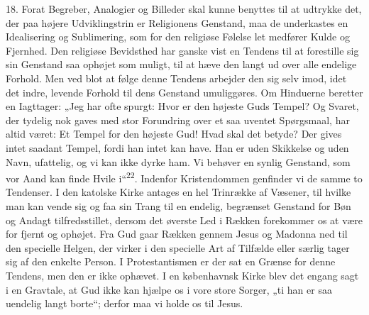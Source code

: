 \documentclass[12pt,a4paper,openany]{book}
\begin{document}
18. Forat Begreber, Analogier og Billeder skal kunne benyttes til at
udtrykke det, der paa højere Udviklingstrin er Religionens Genstand, maa
de underkastes en Idealisering og Sublimering, som for den religiøse
Følelse let medfører Kulde og Fjernhed. Den religiøse Bevidsthed har
ganske vist en Tendens til at forestille sig sin Genstand saa ophøjet
som muligt, til at hæve den langt ud over alle endelige Forhold. Men ved
blot at følge denne Tendens arbejder den sig selv imod, idet det indre,
levende Forhold til dens Genstand umuliggøres. Om Hinduerne beretter en
Iagttager: „Jeg har ofte spurgt: Hvor er den højeste Guds Tempel? Og
Svaret, der tydelig nok gaves med stor Forundring over et saa uventet
Spørgsmaal, har altid været: Et Tempel for den højeste Gud! Hvad skal
det betyde? Der gives intet saadant Tempel, fordi han intet kan have.
Han er uden Skikkelse og uden Navn, ufattelig, og vi kan ikke dyrke ham.
Vi behøver en synlig Genstand, som vor Aand kan finde Hvile
i“\textsuperscript{22}. Indenfor Kristendommen genfinder vi de samme to
Tendenser. I den katolske Kirke antages en hel Trinrække af Væsener, til
hvilke man kan vende sig og faa sin Trang til en endelig, begrænset
Genstand for Bøn og Andagt tilfredsstillet, dersom det øverste Led i
Rækken forekommer os at være for fjernt og ophøjet. Fra Gud gaar Rækken
gennem Jesus og Madonna ned til den specielle Helgen, der virker i den
specielle Art af Tilfælde eller særlig tager sig af den enkelte Person.
I Protestantismen er der sat en Grænse for denne Tendens, men den er
ikke ophævet. I en københavnsk Kirke blev det engang sagt i en Gravtale,
at Gud ikke kan hjælpe os i vore store Sorger, „ti han er saa uendelig
langt borte“; derfor maa vi holde os til Jesus.
\end{document}
